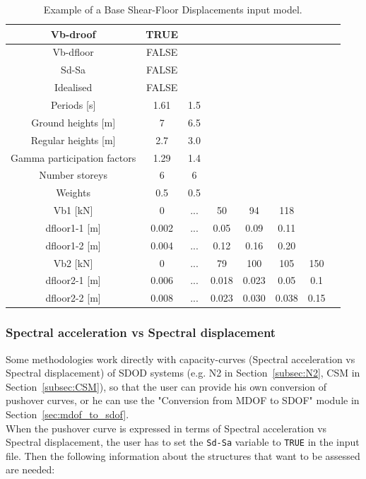 \begin {table}[htb]
\caption{Example of a Base Shear-Floor Displacements input model.}
\label{table:Vb-dfloor_input}
\begin{center}
  \begin{tabular}{ | c | c | c | c | c | c | c | c |}
  \hline
    Vb-droof & TRUE &  &  & & & \\ \hline
    Vb-dfloor & FALSE & & & & &  \\ \hline
    Sd-Sa & FALSE & & & & & \\ \hline
    Idealised & FALSE & & & & & \\ \hline
    Periods [s] & 1.61 & 1.5 & & & & \\ \hline
    Ground heights [m] & 7 & 6.5 & & & & \\ \hline
    Regular heights [m] & 2.7 & 3.0 & & & & \\ \hline
    Gamma participation factors & 1.29 & 1.4 & & & & \\ \hline
    Number storeys & 6 & 6 & & & & \\ \hline
    Weights & 0.5 & 0.5 & & & & \\ \hline
    Vb1 [kN] & 0	& ...	& 50	& 94	& 118	& \\ \hline
	dfloor1-1 [m] & 0.002	& ...	& 0.05	& 0.09	& 0.11	& \\ \hline
	dfloor1-2 [m] & 0.004	& ...	& 0.12	& 0.16	& 0.20	& \\ \hline
    Vb2 [kN] & 0	& ...	& 79	& 100	& 105	& 150 \\ \hline
    dfloor2-1 [m] & 0.006 &	...	& 0.018	& 0.023	& 0.05	& 0.1 \\ \hline
	dfloor2-2 [m] & 0.008	& ... &	0.023	& 0.030	& 0.038	& 0.15 \\ \hline
  \end{tabular}
\end{center}
\end{table}

\subsubsection{Spectral acceleration vs Spectral displacement}
\label{subsubsec:Sa-Sd}
Some methodologies work directly with capacity-curves (Spectral acceleration vs Spectral displacement) of SDOD systems (e.g. N2 in Section~\ref{subsec:N2}, CSM in Section~\ref{subsec:CSM}), so that the user can provide his own conversion of pushover curves, or he can use the "Conversion from MDOF to SDOF" module in Section~\ref{sec:mdof_to_sdof}.\\
When the pushover curve is expressed in terms of Spectral acceleration vs Spectral displacement, the user has to set the \verb=Sd-Sa= variable to \verb=TRUE= in the input file. Then the following information about the structures that want to be assessed are needed:\\

